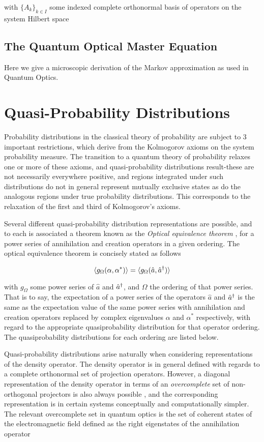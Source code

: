 with ${\{A_k\}}_{k \in I}$ some indexed complete orthonormal basis of operators on the system Hilbert space

\subsection{The Quantum Optical Master Equation}\cite{Breuer2002}\cite{Walls2008}
Here we give a microscopic derivation of the Markov approximation as used in Quantum Optics.

\section{Quasi-Probability Distributions}
Probability distributions in the classical theory of probability are subject to 3 important restrictions, which derive from the Kolmogorov axioms on the system probability measure.
The transition to a quantum theory of probability relaxes one or more of these axioms, and quasi-probability distributions result-these are not necessarily everywhere positive, and regions integrated under such distributions do not in general represent mutually exclusive states as do the analogous regions under true probability distributions.
This corresponds to the relaxation of the first and third of Kolmogorov's axioms.

Several different quasi-probability distribution representations are possible\cite{Walls2008}, and to each is associated a theorem known as the \emph{Optical equivalence theorem} \cite{Sudarshan1963}, for a power series of annihilation and creation operators in a given ordering.
The optical equivalence theorem is concisely stated as follows

\begin{equation}
	\langle g_{\Omega} (\alpha, \alpha^*) \rangle = \langle g_{\Omega} (\hat{a}, \hat{a}^\dagger) \rangle
\end{equation}

with $g_\Omega$ some power series of $\hat{a}$ and $\hat{a}^\dagger$, and $\Omega$ the ordering of that power series.
That is to say, the expectation of a power series of the operators $\hat{a}$ and $\hat{a}^\dagger$ is the same as the expectation value of the same power series with annihilation and creation operators replaced by complex eigenvalues $\alpha$ and $\alpha^*$ respectively, with regard to the appropriate quasiprobability distribution for that operator ordering.
The quasiprobability distributions for each ordering are listed below.

Quasi-probability distributions arise naturally when considering representations of the density operator.
The density operator is in general defined with regards to a complete orthonormal set of projection operators.
However, a diagonal representation of the density operator in terms of an \emph{overcomplete} set of non-orthogonal projectors is also always possible \cite{Sudarshan1963}, and the corresponding representation is in certain systems conceptually and computationally simpler.
The relevant overcomplete set in quantum optics is the set of coherent states of the electromagnetic field defined as the right eigenstates of the annihilation operator

